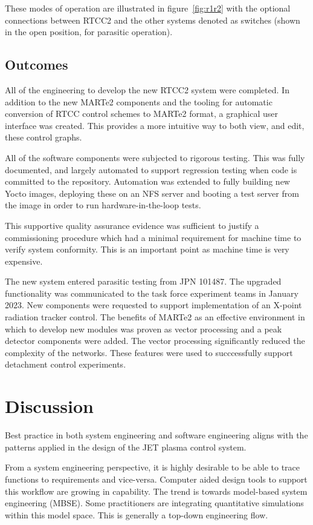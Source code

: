 \documentclass[5p]{elsarticle}
\begin{document}
These modes of operation are illustrated in figure~\ref{fig:r1r2}
with the optional connections between RTCC2 and the other
systems denoted as switches (shown in the open position, for
parasitic operation).

\subsection{Outcomes}

All of the engineering to develop the new RTCC2 system were completed.
In addition to the new MARTe2 components and the tooling for automatic
conversion of RTCC control schemes to MARTe2 format, a graphical
user interface was created.  This provides a more intuitive way to both
view, and edit, these control graphs.

All of the software components were subjected to rigorous testing.
This was fully documented, and largely automated to support
regression testing when code is committed to the repository.
Automation was extended to fully building new Yocto images, 
deploying these on an NFS server and booting a test server 
from the image in order to run hardware-in-the-loop tests.

This supportive quality assurance evidence was sufficient to 
justify a commissioning procedure which had a minimal requirement
for machine time to verify system conformity.  This is an important
point as machine time is very expensive.

The new system entered parasitic testing from JPN 101487.  The upgraded
functionality was communicated to the task force experiment teams in 
January 2023.  New components were requested to support implementation
of an X-point radiation tracker control. The benefits of MARTe2 as
an effective environment in which to develop new modules was proven
as vector processing and a peak detector components were added.
The vector processing significantly reduced the complexity of 
the networks.  These features were used to succcessfully support detachment
control experiments.


\section{Discussion}

Best practice in both system engineering and software engineering 
aligns with the patterns applied in the design of the JET plasma control system.

From a system engineering perspective, it is highly desirable to be
able to trace functions to requirements and vice-versa. Computer
aided design tools to support this workflow are growing in capability.
The trend is towards model-based system engineering (MBSE).  Some
practitioners are integrating quantitative simulations within this
model space. This is generally a top-down engineering flow.
\end{document}
